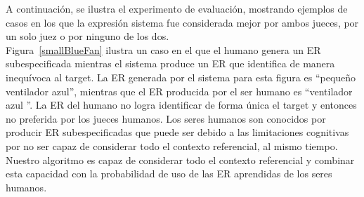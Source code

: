 A continuaci\'on, se ilustra el experimento de evaluaci\'on, mostrando ejemplos de casos en los que la expresi\'on sistema fue considerada mejor por ambos jueces, por un solo juez o por ninguno de los dos.\\

Figura~\ref{smallBlueFan} ilustra un caso en el que el humano genera un ER subespecificada mientras el sistema produce un ER que identifica de manera inequ\'{i}voca al target. La ER generada por el sistema para esta figura es ``peque\~no ventilador azul'', mientras que el ER producida por el ser humano es ``ventilador azul ''. La ER del humano no logra identificar de forma \'unica el target y entonces no preferida por los jueces humanos. Los seres humanos son conocidos por producir ER subespecificadas que puede ser debido a las limitaciones cognitivas por no ser capaz de considerar todo el contexto referencial, al mismo tiempo. Nuestro algoritmo es capaz de considerar todo el contexto referencial y combinar esta capacidad con la probabilidad de uso de las ER aprendidas de los seres humanos.




